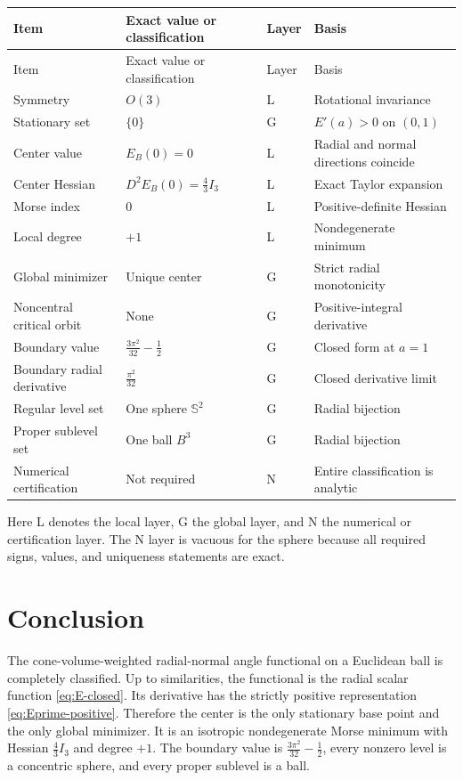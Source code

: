 \documentclass[11pt]{article}
\theoremstyle{definition}
\newcommand{\Sph}{\mathbb{S}}
\begin{document}
\begin{longtable}{>{\raggedright\arraybackslash}p{} >{\raggedright\arraybackslash}p{} >{\raggedright\arraybackslash}p{} >{\raggedright\arraybackslash}p{}}
\toprule
Item & Exact value or classification & Layer & Basis \\
\midrule
\endfirsthead
\toprule
Item & Exact value or classification & Layer & Basis \\
\midrule
\endhead
Symmetry & $O(3)$ & L & Rotational invariance \\
Stationary set & $\{0\}$ & G & $E'(a)>0$ on $(0,1)$ \\
Center value & $E_B(0)=0$ & L & Radial and normal directions coincide \\
Center Hessian & $D^2E_B(0)=\frac43I_3$ & L & Exact Taylor expansion \\
Morse index & $0$ & L & Positive-definite Hessian \\
Local degree & $+1$ & L & Nondegenerate minimum \\
Global minimizer & Unique center & G & Strict radial monotonicity \\
Noncentral critical orbit & None & G & Positive-integral derivative \\
Boundary value & $\frac{3\pi^2}{32}-\frac12$ & G & Closed form at $a=1$ \\
Boundary radial derivative & $\frac{\pi^2}{32}$ & G & Closed derivative limit \\
Regular level set & One sphere $\Sph^2$ & G & Radial bijection \\
Proper sublevel set & One ball $B^3$ & G & Radial bijection \\
Numerical certification & Not required & N & Entire classification is analytic \\
\bottomrule
\end{longtable}

Here L denotes the local layer, G the global layer, and N the numerical or certification layer.  The N layer is vacuous for the sphere because all required signs, values, and uniqueness statements are exact.

\section{Conclusion}

The cone-volume-weighted radial-normal angle functional on a Euclidean ball is completely classified.  Up to similarities, the functional is the radial scalar function \eqref{eq:E-closed}.  Its derivative has the strictly positive representation \eqref{eq:Eprime-positive}.  Therefore the center is the only stationary base point and the only global minimizer.  It is an isotropic nondegenerate Morse minimum with Hessian $\frac43I_3$ and degree $+1$.  The boundary value is $\frac{3\pi^2}{32}-\frac12$, every nonzero level is a concentric sphere, and every proper sublevel is a ball.
\end{document}
